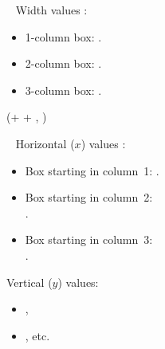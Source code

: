 \documentclass{beamer}
\newlength{\blockOne}
\newlength{\blockTwo}
\newlength{\blockFour}
\begin{document}
\begin{frame}[t]
\begin{textblock*}{\colwidth}
\begin{parblock}{~}
	\vspace{0.666667\baselineskip}\noindent%
	\alert{Width values} :
	\begin{itemize}
		\setlength{\itemsep}{0pt}
		\item 1-column box: .
		\item 2-column box: .
		\item 3-column box: .
	\end{itemize}

\end{parblock}

\end{textblock*}




\begin{textblock*}{\colwidth}(\leftmargin + \colwidth + \colsep, \blockFour)

\begin{parblock}{~}
	\alert{Horizontal ($x$) values} :
	\begin{itemize}
		\setlength{\itemsep}{0pt}
		\item Box starting in column~1: .
		\item Box starting in column~2: \\
			.
		\item Box starting in column~3: \\
			.
	\end{itemize}

	\vspace{0.333333\baselineskip}\noindent%
	\alert{Vertical ($y$) values:}
	\begin{itemize}
		\setlength{\itemsep}{0pt}
		\item {},
		\item {}, etc.
	\end{itemize}
\end{parblock}

\end{textblock*}





\end{frame}
\end{document}

